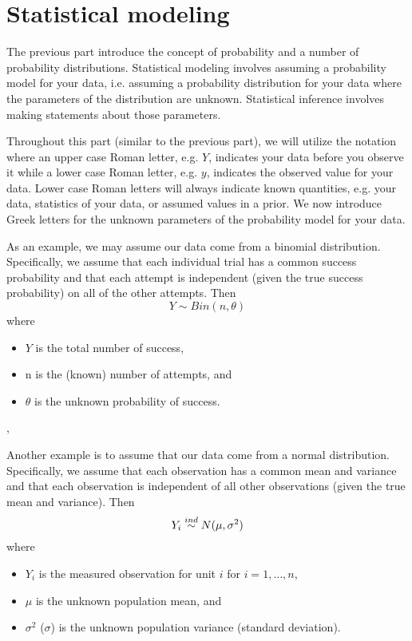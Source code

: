 
\chapter{Statistical modeling}

The previous part introduce the concept of probability and a number of 
probability distributions.
Statistical modeling involves assuming a probability model for your data,
i.e. assuming a probability distribution for your data
where the parameters of the distribution are unknown.
Statistical inference involves making statements about those parameters.

Throughout this part (similar to the previous part),
we will utilize the notation where an upper case Roman letter, e.g. $Y$,
indicates your data before you observe it
while a lower case Roman letter, e.g. $y$, 
indicates the observed value for your data.
Lower case Roman letters will always indicate known quantities, e.g. your data, 
statistics of your data, or assumed values in a prior.
We now introduce Greek letters for the unknown parameters of the probability 
model for your data.

As an example, 
we may assume our data come from a binomial distribution.
Specifically, 
we assume that each individual trial has a common success probability and 
that each attempt is independent (given the true success probability) on 
all of the other attempts. 
Then 
\[ Y\sim Bin(n,\theta) \]
where 
\begin{itemize}
\item $Y$ is the total number of success,
\item n is the (known) number of attempts, and
\item $\theta$ is the unknown probability of success.
\end{itemize},
 
Another example is to assume that our data come from a normal distribution.
Specifically,
we assume that each observation has a common mean and variance and that each 
observation is independent of all other observations (given the true mean and
variance).
Then 
\[ Y_i\stackrel{ind}{\sim} N(\mu,\sigma^2) \]
where 
\begin{itemize}
\item $Y_i$ is the measured observation for unit $i$ for $i=1,\ldots,n$,
\item $\mu$ is the unknown population mean, and
\item $\sigma^2$ ($\sigma$) is the unknown population variance (standard 
deviation).
\end{itemize}


